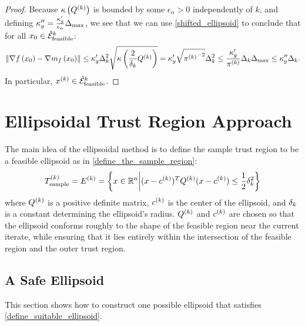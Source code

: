 \begin{proof}
Because ${\kappa} \left({Q^{(k)}}\right)$ is bounded by some $\epsilon_{\alpha} > 0$ independently of $k$, 
and defining $\kappa''_{g} =  \frac{\kappa'_g}{\epsilon_{\alpha}}{\Delta_{\textrm{max}}}$, we see that
we can use  \cref{shifted_ellipsoid} to conclude that for all $x_0 \in {{\mathcal {\hat E}_{\text{feasible}}}^k}$:
\begin{align*}
\left\|\nabla f\left(x_0 \right) - \nabla m_f\left(x_0\right)\right\| \le 
\kappa'_g  \Delta_k^2 \sqrt{{\kappa} \left(\frac 2 {\delta_k} Q^{(k)}\right)}=  \kappa'_g \sqrt{{\pi^{(k)}}^{-2}}\Delta_k^2 \le \frac{\kappa'_g}{{\pi^{(k)}}} \Delta_k{\Delta_{\textrm{max}}}\le \kappa''_g\Delta_k.
\end{align*}
In particular, $x^{(k)} \in {{\mathcal {\hat E}_{\text{feasible}}}^k}$.
\end{proof}




\section{Ellipsoidal Trust Region Approach}\label{sec:ellipsoidal}

The main idea of the ellipsoidal method is to define the sample trust region to be a feasible ellipsoid as in \cref{define_the_sample_region}:
\begin{align*}
{T_{\text{sample}}^{(k)}} = {E^{(k)}} = \left\{x \in \mathbb R^n \bigg | (x - c^{(k)})^T {Q^{(k)}} (x - c^{(k)}) \le \frac 1 2 \delta_k^2 \right\}
\end{align*}
where ${Q^{(k)}}$ is a positive definite matrix, $c^{(k)}$ is the center of the ellipsoid, and $\delta_k$ is a constant determining the ellipsoid's radius.   
${Q^{(k)}}$ and $c^{(k)}$ are chosen so that the ellipsoid conforms roughly to the shape of the feasible region near the current iterate, 
while ensuring that it lies entirely within the intersection of the feasible region and the outer trust region.



\subsection{A Safe Ellipsoid}

This section shows how to construct one possible ellipsoid that satisfies \cref{define_suitable_ellipsoid}.

